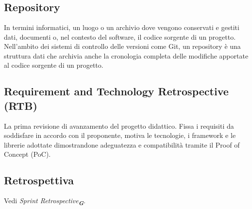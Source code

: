 \section{}

\subsection*{Repository}
In termini informatici, un luogo o un archivio dove vengono conservati e gestiti dati, documenti o, nel contesto del software, il codice sorgente di un 
progetto. Nell'ambito dei sistemi di controllo delle versioni come Git, un repository è una struttura dati che archivia anche la cronologia completa delle 
modifiche apportate al codice sorgente di un progetto.

\subsection*{Requirement and Technology Retrospective (RTB)}
La prima revisione di avanzamento del progetto didattico. Fissa i requisiti da soddisfare in accordo con il proponente, motiva le tecnologie, i framework 
e le librerie adottate dimostrandone adeguatezza e compatibilità tramite il Proof of Concept (PoC).

\subsection*{Retrospettiva}
Vedi \emph{Sprint Retrospective}\textsubscript{\textit{\textbf{G}}}.

\newpage